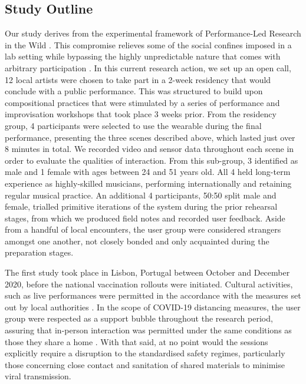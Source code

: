 \subsection{Study Outline}

Our study derives from the experimental framework of Performance-Led Research in the Wild \citep{benford_performance-led_2013}. This compromise relieves some of the social confines imposed in a lab setting while bypassing the highly unpredictable nature that comes with arbitrary participation \citep{heron_par_2017}. In this current research action, we set up an open call, 12 local artists were chosen to take part in a 2-week residency that would conclude with a public performance. This was structured to build upon compositional practices that were stimulated by a series of performance and improvisation workshops that took place 3 weeks prior. From the residency group, 4 participants were selected to use the wearable during the final performance, presenting the three scenes described above, which lasted just over 8 minutes in total. We recorded video and sensor data throughout each scene in order to evaluate the qualities of interaction. From this sub-group, 3 identified as male and 1 female with ages between 24 and 51 years old. All 4 held long-term experience as highly-skilled musicians, performing internationally and retaining regular musical practice. An additional 4 participants, 50:50 split male and female, trialled primitive iterations of the system during the prior rehearsal stages, from which we produced field notes and recorded user feedback. Aside from a handful of local encounters, the user group were considered strangers amongst one another, not closely bonded and only acquainted during the preparation stages.

The first study took place in Lisbon, Portugal between October and December 2020, before the national vaccination rollouts were initiated. Cultural activities, such as live performances were permitted in the accordance with the measures set out by local authorities \cite{direcao-geral_da_saude_dgs_covid-19_2020}. In the scope of COVID-19 distancing measures, the user group were respected as a support bubble throughout the research period, assuring that in-person interaction was permitted under the same conditions as those they share a home \citep{trotter_ways_2021}. With that said, at no point would the sessions explicitly require a disruption to the standardised safety regimes, particularly those concerning close contact and sanitation of shared materials to minimise viral transmission.

